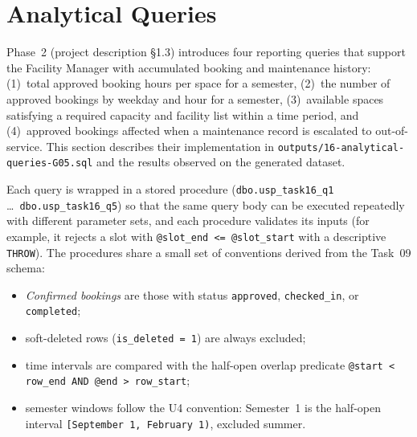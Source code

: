 \section{Analytical Queries}
\label{sec:analytical-queries}


Phase~2 (project description \S1.3) introduces four reporting queries that
support the Facility Manager with accumulated booking and maintenance
history: (1)~total approved booking hours per space for a semester, (2)~the
number of approved bookings by weekday and hour for a semester, (3)~available
spaces satisfying a required capacity and facility list within a time period,
and (4)~approved bookings affected when a maintenance record is escalated to
out-of-service. This section describes their implementation in
\texttt{outputs/16-analytical-queries-G05.sql} and the results observed on the
generated dataset.

Each query is wrapped in a stored procedure (\texttt{dbo.usp\_task16\_q1}
\ldots\ \texttt{dbo.usp\_task16\_q5}) so that the same query body can be
executed repeatedly with different parameter sets, and each procedure validates
its inputs (for example, it rejects a slot with \texttt{@slot\_end <=
@slot\_start} with a descriptive \texttt{THROW}). The procedures share a small
set of conventions derived from the Task~09 schema:

\begin{itemize}[noitemsep]
    \item \emph{Confirmed bookings} are those with status
    \texttt{approved}, \texttt{checked\_in}, or \texttt{completed};
    \item soft-deleted rows (\texttt{is\_deleted = 1}) are always excluded;
    \item time intervals are compared with the half-open overlap predicate
    \texttt{@start < row\_end AND @end > row\_start};
    \item semester windows follow the U4 convention: Semester~1 is the
    half-open interval \texttt{[September 1, February 1)}, excluded summer.
\end{itemize}

